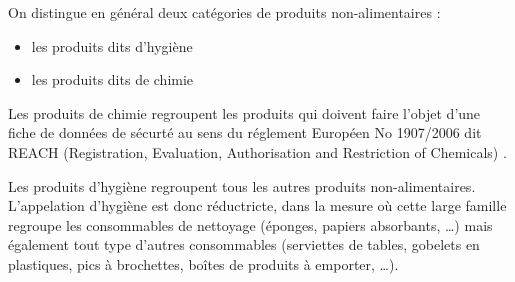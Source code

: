                 On distingue en général deux catégories de produits non-alimentaires : 
                \begin{itemize}
                    \item les produits dits \og d'hygiène \fg
                    \item les produits dits \og de chimie \fg
                \end{itemize}

                Les produits de chimie regroupent les produits qui doivent faire l'objet d'une fiche de données de sécurté au sens du réglement Européen No 1907/2006 dit \og REACH \fg (Registration, Evaluation, Authorisation and Restriction of Chemicals) \cite{reach_text}.

                Les produits d'hygiène regroupent tous les autres produits non-alimentaires.
                L'appelation \og d'hygiène \fg est donc réductricte, dans la mesure où cette large famille regroupe les consommables de nettoyage (éponges, papiers absorbants, \dots) mais également tout type d'autres consommables (serviettes de tables, gobelets en plastiques, pics à brochettes, boîtes de produits à emporter, \dots).


